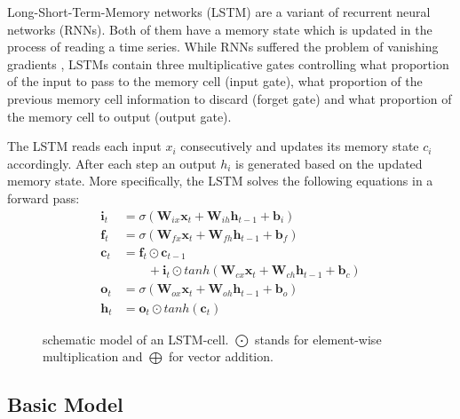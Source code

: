 \documentclass[11pt,a4paper]{article}
\begin{document}
Long-Short-Term-Memory networks (LSTM) \cite{hochreiter1997long} are a variant of recurrent neural networks (RNNs). Both of them have a memory state which is updated in the process of reading a time series. While RNNs suffered the problem of vanishing gradients \cite{hochreiter1997long}, LSTMs contain three multiplicative gates controlling what proportion of the input to pass to the memory cell (input gate), what proportion of the previous memory cell information to discard (forget gate) and what proportion of the memory cell to output (output gate).

The LSTM reads each input $x_i$ consecutively and updates its memory state $c_i$ accordingly. After each step an output $h_i$ is generated based on the updated memory state. More specifically, the LSTM solves the following equations in a forward pass:
%
\begin{equation}
\begin{split}
    \mathbf{i}_t &= \sigma(\mathbf{W}_{ix}\mathbf{x}_t+\mathbf{W}_{ih}\mathbf{h}_{t-1}+\mathbf{b}_i) \\
    \mathbf{f}_t &= \sigma(\mathbf{W}_{fx}\mathbf{x}_t+\mathbf{W}_{fh}\mathbf{h}_{t-1}+\mathbf{b}_f) \\
    \mathbf{c}_t &= \mathbf{f}_t \odot \mathbf{c}_{t-1}\\
    & \qquad +\mathbf{i}_t \odot tanh(\mathbf{W}_{cx}\mathbf{x}_t + \mathbf{W}_{ch}\mathbf{h}_{t-1}+\mathbf{b}_c) \\
    \mathbf{o}_t &= \sigma(\mathbf{W}_{ox}\mathbf{x}_t + \mathbf{W}_{oh}\mathbf{h}_{t-1} + \mathbf{b}_o)\\
    \mathbf{h}_t &= \mathbf{o}_t \odot tanh(\mathbf{c}_t) 
    \label{eq:lstm_equations}
\end{split}
\end{equation}

\begin{figure}[h]
    \centering
    
    \caption{schematic model of an LSTM-cell. $\bigodot$ stands for element-wise multiplication and $\bigoplus$ for vector addition.}
    \label{fig:lstm_cell}

\end{figure}
%
\subsection{Basic Model}
\end{document}
